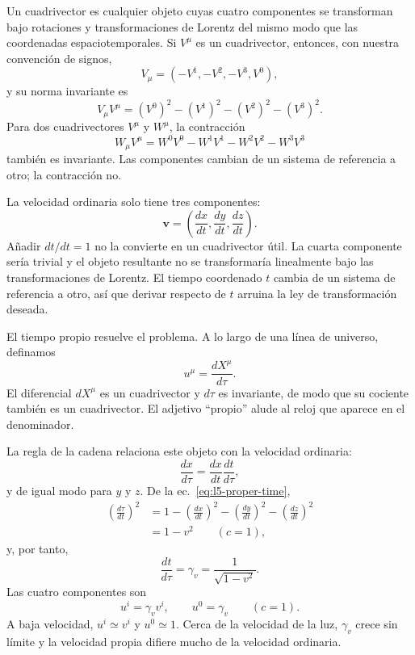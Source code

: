 Un cuadrivector es cualquier objeto cuyas cuatro componentes se transforman bajo rotaciones y transformaciones de Lorentz del mismo modo que las coordenadas espaciotemporales. Si \(V^\mu\) es un cuadrivector, entonces, con nuestra convención de signos,
\begin{equation}
V_\mu=(-V^1,-V^2,-V^3,V^0),
\end{equation}
y su norma invariante es
\begin{equation}
V_\mu V^\mu=(V^0)^2-(V^1)^2-(V^2)^2-(V^3)^2.
\end{equation}
Para dos cuadrivectores \(V^\mu\) y \(W^\mu\), la contracción
\begin{equation}
W_\mu V^\mu
=W^0V^0-W^1V^1-W^2V^2-W^3V^3
\end{equation}
también es invariante. Las componentes cambian de un sistema de referencia a otro; la contracción no.

La velocidad ordinaria solo tiene tres componentes:
\begin{equation}
\mathbf v=\left(\frac{dx}{dt},\frac{dy}{dt},\frac{dz}{dt}\right).
\end{equation}
Añadir \(dt/dt=1\) no la convierte en un cuadrivector útil. La cuarta componente sería trivial y el objeto resultante no se transformaría linealmente bajo las transformaciones de Lorentz. El tiempo coordenado \(t\) cambia de un sistema de referencia a otro, así que derivar respecto de \(t\) arruina la ley de transformación deseada.

El tiempo propio resuelve el problema. A lo largo de una línea de universo, definamos
\begin{equation}
u^\mu=\frac{dX^\mu}{d\tau}.
\label{eq:l5-four-velocity}
\end{equation}
El diferencial \(dX^\mu\) es un cuadrivector y \(d\tau\) es invariante, de modo que su cociente también es un cuadrivector. El adjetivo ``propio'' alude al reloj que aparece en el denominador.

La regla de la cadena relaciona este objeto con la velocidad ordinaria:
\begin{equation}
\frac{dx}{d\tau}=\frac{dx}{dt}\frac{dt}{d\tau},
\end{equation}
y de igual modo para \(y\) y \(z\). De la ec.~\eqref{eq:l5-proper-time},
\begin{align}
\left(\frac{d\tau}{dt}\right)^2
&=1-\left(\frac{dx}{dt}\right)^2
    -\left(\frac{dy}{dt}\right)^2
    -\left(\frac{dz}{dt}\right)^2\nonumber\\
&=1-v^2
\qquad(c=1),
\end{align}
y, por tanto,
\begin{equation}
\frac{dt}{d\tau}=\gamma_v=\frac{1}{\sqrt{1-v^2}}.
\end{equation}
Las cuatro componentes son
\begin{equation}
u^i=\gamma_v v^i,
\qquad
u^0=\gamma_v
\qquad(c=1).
\label{eq:l5-four-velocity-components}
\end{equation}
A baja velocidad, \(u^i\simeq v^i\) y \(u^0\simeq1\). Cerca de la velocidad de la luz, \(\gamma_v\) crece sin límite y la velocidad propia difiere mucho de la velocidad ordinaria.

